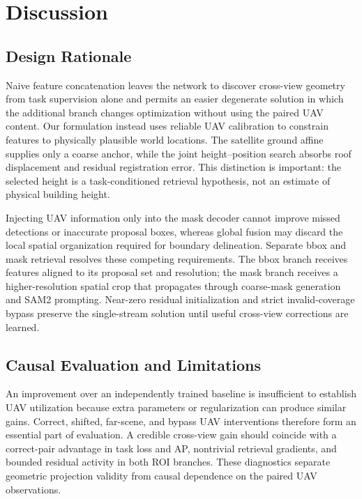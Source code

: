 \documentclass[letterpaper,journal]{IEEEtran}
\begin{document}
\section{Discussion}
\label{sec:discussion}

\subsection{Design Rationale}
Naive feature concatenation leaves the network to discover cross-view geometry from task supervision alone and permits an easier degenerate solution in which the additional branch changes optimization without using the paired UAV content. Our formulation instead uses reliable UAV calibration to constrain features to physically plausible world locations. The satellite ground affine supplies only a coarse anchor, while the joint height--position search absorbs roof displacement and residual registration error. This distinction is important: the selected height is a task-conditioned retrieval hypothesis, not an estimate of physical building height.

Injecting UAV information only into the mask decoder cannot improve missed detections or inaccurate proposal boxes, whereas global fusion may discard the local spatial organization required for boundary delineation. Separate bbox and mask retrieval resolves these competing requirements. The bbox branch receives features aligned to its proposal set and resolution; the mask branch receives a higher-resolution spatial crop that propagates through coarse-mask generation and SAM2 prompting. Near-zero residual initialization and strict invalid-coverage bypass preserve the single-stream solution until useful cross-view corrections are learned.

\subsection{Causal Evaluation and Limitations}
An improvement over an independently trained baseline is insufficient to establish UAV utilization because extra parameters or regularization can produce similar gains. Correct, shifted, far-scene, and bypass UAV interventions therefore form an essential part of evaluation. A credible cross-view gain should coincide with a correct-pair advantage in task loss and AP, nontrivial retrieval gradients, and bounded residual activity in both ROI branches. These diagnostics separate geometric projection validity from causal dependence on the paired UAV observations.
\end{document}
